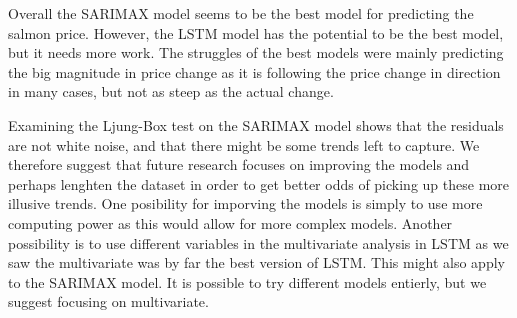 Overall the SARIMAX model seems to be the best model for predicting the salmon price. However, the LSTM model has the potential to be the best model, but it needs more work. The struggles of the best models were mainly predicting the big magnitude in price change as it is following the price change in direction in many cases, but not as steep as the actual change.

Examining the Ljung-Box test on the SARIMAX model shows that the residuals are not white noise, and that there might be some trends left to capture. We therefore suggest that future research focuses on improving the models and perhaps lenghten the dataset in order to get better odds of picking up these more illusive trends. One posibility for imporving the models is simply to use more computing power as this would allow for more complex models. Another possibility is to use different variables in the multivariate analysis in LSTM as we saw the multivariate was by far the best version of LSTM. This might also apply to the SARIMAX model. It is possible to try different models entierly, but we suggest focusing on multivariate.
